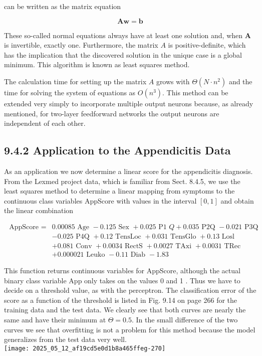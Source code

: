 \documentclass[10pt]{article}
\begin{document}
can be written as the matrix equation


\begin{equation*}
\boldsymbol{A} \boldsymbol{w}=\boldsymbol{b} \tag{9.13}
\end{equation*}


These so-called normal equations always have at least one solution and, when $\boldsymbol{A}$ is invertible, exactly one. Furthermore, the matrix $A$ is positive-definite, which has the implication that the discovered solution in the unique case is a global minimum. This algorithm is known as least squares method.

The calculation time for setting up the matrix $A$ grows with $\Theta\left(N \cdot n^{2}\right)$ and the time for solving the system of equations as $O\left(n^{3}\right)$. This method can be extended very simply to incorporate multiple output neurons because, as already mentioned, for two-layer feedforward networks the output neurons are independent of each other.

\subsection*{9.4.2 Application to the Appendicitis Data}
As an application we now determine a linear score for the appendicitis diagnosis. From the Lexmed project data, which is familiar from Sect. 8.4.5, we use the least squares method to determine a linear mapping from symptoms to the continuous class variables AppScore with values in the interval $[0,1]$ and obtain the linear combination

$$
\begin{aligned}
\text { AppScore }= & 0.00085 \text { Age }-0.125 \text { Sex }+0.025 \text { P1 } Q+0.035 \text { P2Q }-0.021 \text { P3Q } \\
& -0.025 \text { P4Q }+0.12 \text { TensLoc }+0.031 \text { TensGlo }+0.13 \text { Losl } \\
& +0.081 \text { Conv }+0.0034 \text { RectS }+0.0027 \text { TAxi }+0.0031 \text { TRec } \\
& +0.000021 \text { Leuko }-0.11 \text { Diab }-1.83
\end{aligned}
$$

This function returns continuous variables for AppScore, although the actual binary class variable App only takes on the values 0 and 1 . Thus we have to decide on a threshold value, as with the perceptron. The classification error of the score as a function of the threshold is listed in Fig. 9.14 on page 266 for the training data and the test data. We clearly see that both curves are nearly the same and have their minimum at $\Theta=0.5$. In the small difference of the two curves we see that overfitting is not a problem for this method because the model generalizes from the test data very well.\\
\texttt{[image: 2025\_05\_12\_af19cd5e0d1b8a465ffeg-270]}
\end{document}
